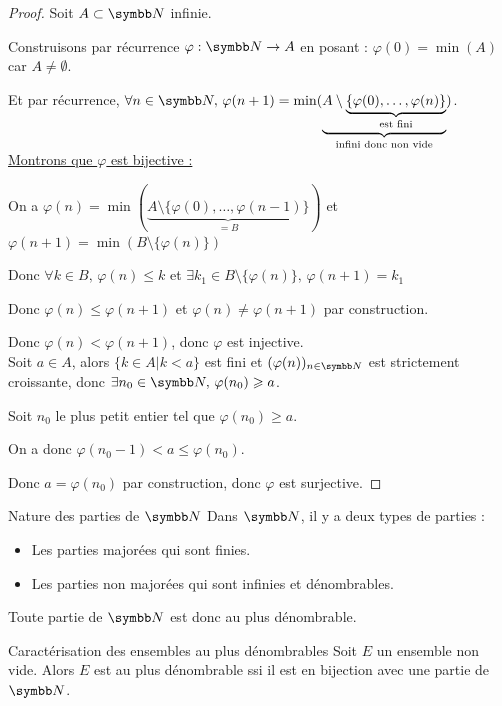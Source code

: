 \begin{proof}
    Soit $A \subset \N$ infinie. 

    Construisons par récurrence $\varphi : \N \to A$ en posant : $\varphi(0) = \min(A)$ car $A \neq \emptyset$.

    Et par récurrence, $\forall n \in \N, \, \varphi(n+1) = \min(\underbrace{A \setminus \underbrace{\{\varphi(0), \ldots, \varphi(n)\}}_{\text{est fini}}}_{\text{infini donc non vide}})$. \\

    \uline{Montrons que $\varphi$ est bijective :}

    \svspace On a $\varphi(n) = \min(\underbrace{A \setminus \{\varphi(0), \ldots, \varphi(n-1)\}}_{= B })$ 
    et $\varphi(n + 1) = \min(B \setminus \{ \varphi(n) \})$ 

    Donc $\forall k \in B, \, \varphi(n) \leqslant k$ et $\exists k_1 \in B \setminus \{\varphi(n)\}, \, \varphi(n + 1) = k_1$

    Donc $\varphi(n) \leqslant \varphi(n + 1)$ et $\varphi (n) \neq \varphi(n + 1)$ par construction.

    Donc $\varphi(n) < \varphi(n + 1)$, donc $\varphi$ est injective. \\

    Soit $a \in A$, alors $\{k \in A | k < a\}$ est fini et $(\varphi(n))_{n \in \N}$ est strictement croissante, donc
    $\exists n_0 \in \N, \, \varphi(n_0) \geqslant a$.

    Soit $n_0$ le plus petit entier tel que $\varphi(n_0) \geqslant a$.

    On a donc $\varphi(n_0 - 1) < a \leqslant \varphi(n_0)$.
  
    Donc $a = \varphi(n_0)$ par construction, donc $\varphi$ est surjective.
\end{proof}

\begin{proposition}{Nature des parties de $\N$}{}
    Dans $\N$, il y a deux types de parties : 
    \begin{itemize}
        \item Les parties majorées qui sont finies.
        \item Les parties non majorées qui sont infinies et dénombrables.
    \end{itemize}

    Toute partie de $\N$ est donc au plus dénombrable. 
\end{proposition}

\begin{proposition}{Caractérisation des ensembles au plus dénombrables}{}
    Soit $E$ un ensemble non vide. Alors $E$ est au plus dénombrable ssi il est en 
    bijection avec une partie de $\N$.
\end{proposition}

